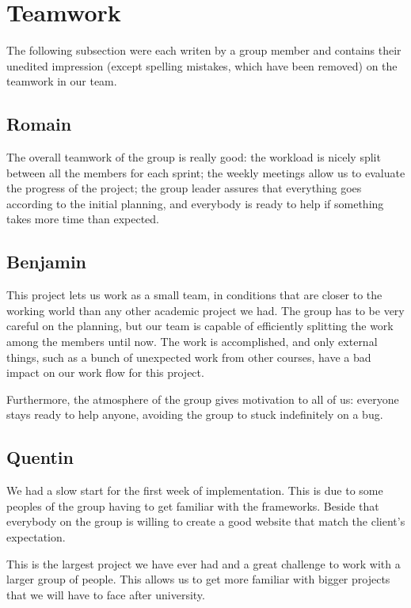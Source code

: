 \section{Teamwork}

The following subsection were each writen by a group member and contains their unedited impression (except spelling mistakes, which have been removed) on the teamwork in our team. \newline

\subsection{Romain}
The overall teamwork of the group is really good: the workload is nicely
split between all the members for each sprint; the weekly meetings allow
us to evaluate the progress of the project; the group leader assures that
everything goes according to the initial planning, and everybody is ready to
help if something takes more time than expected. \newline

\subsection{Benjamin}

This project lets us work as a small team, in conditions that are closer to
the working world than any other academic project we had. The group has to
be very careful on the planning, but our team is capable of efficiently
splitting the work among the members until now. The work is accomplished,
and only external things, such as a bunch of unexpected work from other
courses, have a bad impact on our work flow for this project. \newline

Furthermore, the atmosphere of the group gives motivation to all of us:
everyone stays ready to help anyone, avoiding the group to stuck
indefinitely on a bug.

\subsection{Quentin}
We had a slow start for the first week of implementation. This is due to
some peoples of the group having to get familiar with the frameworks.
Beside that everybody on the group is willing to create a good website that
match the client's expectation. \newline

This is the largest project we have ever had and a great challenge to work
with a larger group of people. This allows us to get more familiar with
bigger projects that we will have to face after university.

